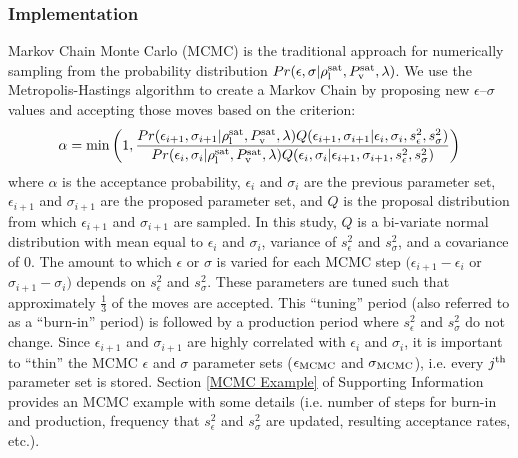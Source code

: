 \documentclass[preprint,letterpaper,floatfix,citeautoscript,aip,jcp]{revtex4-1}
\begin{document}
\subsubsection{Implementation}
Markov Chain Monte Carlo (MCMC) is the traditional approach for numerically sampling from the probability distribution $Pr(\epsilon,\sigma|\rho_{\rm l}^{\rm sat},P_{\rm v}^{\rm sat},\lambda)$. We use the Metropolis-Hastings algorithm to create a Markov Chain by proposing new $\epsilon$--$\sigma$ values and accepting those moves based on the criterion:
\begin{equation} \label{eq:Acceptance}
\alpha = \min\left(1,\frac{Pr(\epsilon_{i+1},\sigma_{i+1}|\rho_{\rm l}^{\rm sat},P_{\rm v}^{\rm sat},\lambda)Q(\epsilon_{i+1},\sigma_{i+1}|\epsilon_i,\sigma_i,s^2_\epsilon,s^2_\sigma)}{Pr(\epsilon_i,\sigma_i|\rho_{\rm l}^{\rm sat},P_{\rm v}^{\rm sat},\lambda)Q(\epsilon_i,\sigma_i|\epsilon_{i+1},\sigma_{i+1},s^2_\epsilon,s^2_\sigma)}\right)
\end{equation} 
where $\alpha$ is the acceptance probability, $\epsilon_i$ and $\sigma_i$ are the previous parameter set, $\epsilon_{i+1}$ and $\sigma_{i+1}$ are the proposed parameter set, and $Q$ is the proposal distribution from which $\epsilon_{i+1}$ and $\sigma_{i+1}$ are sampled. In this study, 
$Q$ is a bi-variate normal distribution with mean equal to $\epsilon_i$ and $\sigma_i$, variance of $s^2_\epsilon$ and $s^2_\sigma$, and a covariance of 0. The amount to which $\epsilon$ or $\sigma$ is varied for each MCMC step $(\epsilon_{i+1} - \epsilon_i$ or $\sigma_{i+1} - \sigma_i)$ depends on $s^2_\epsilon$ and $s^2_\sigma$. These parameters are tuned such that approximately $\frac{1}{3}$ of the moves are accepted. This ``tuning'' period (also referred to as a ``burn-in'' period) is followed by a production period where $s^2_\epsilon$ and $s^2_\sigma$ do not change. Since $\epsilon_{i+1}$ and $\sigma_{i+1}$ are highly correlated with $\epsilon_i$ and $\sigma_i$, it is important to ``thin'' the MCMC $\epsilon$ and $\sigma$ parameter sets ($\epsilon_{\rm MCMC}$ and $\sigma_{\rm MCMC}$), i.e. every $j^{\rm th}$ parameter set is stored. Section \ref{MCMC Example} of Supporting Information provides an MCMC example with some details (i.e. number of steps for burn-in and production, frequency that $s^2_\epsilon$ and $s^2_\sigma$ are updated, resulting acceptance rates, etc.).
\end{document}
